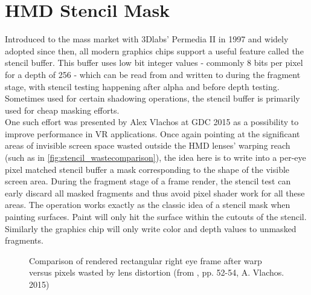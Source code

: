 
\section{HMD Stencil Mask} \label{stencilmask}
Introduced to the mass market with 3Dlabs' Permedia II in 1997 and widely adopted since then, all modern graphics chips support a  useful feature called the stencil buffer. This buffer uses low bit integer values - commonly 8 bits per pixel for a depth of 256 \cite{deVries.2014} - which can be read from and written to during the fragment stage, with stencil testing happening after alpha and before depth testing. Sometimes used for certain shadowing operations, the stencil buffer is primarily used for cheap masking efforts. \\
One such effort was presented by Alex Vlachos at GDC 2015 \cite{Vlachos.2015} as a possibility to improve performance in \gls{VR} applications. Once again pointing at the significant areas of invisible screen space wasted outside the HMD lenses' warping reach (such as in \autoref{fig:stencil_wastecomparison}), the idea here is to write into a per-eye pixel matched stencil buffer a mask corresponding to the shape of the visible screen area. During the fragment stage of a frame render, the stencil test can early discard all masked fragments and thus avoid pixel shader work for all these areas. The operation works exactly as the classic idea of a stencil mask when painting surfaces. Paint will only hit the surface within the cutouts of the stencil. Similarly the graphics chip will only write color and depth values to unmasked fragments. 

\begin{figure}[h]
  \centering
  \hspace*{\fill}
  \hfill
  \hspace*{\fill}
     \caption{Comparison of rendered rectangular right eye frame after warp versus pixels wasted by lens distortion (from \cite{Vlachos.2015}, pp. 52-54, A. Vlachos. 2015)}
     \label{fig:stencil_wastecomparison}
\end{figure}


